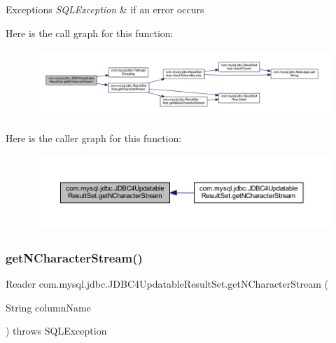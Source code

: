 \begin{DoxyExceptions}{Exceptions}
{\em S\+Q\+L\+Exception} & if an error occurs \\
\hline
\end{DoxyExceptions}
Here is the call graph for this function\+:
\nopagebreak
\begin{figure}[H]
\begin{center}
\leavevmode
\includegraphics[width=350pt]{classcom_1_1mysql_1_1jdbc_1_1_j_d_b_c4_updatable_result_set_a9abc20c9e184a65a0895a24ff6ce7c3c_cgraph}
\end{center}
\end{figure}
Here is the caller graph for this function\+:
\nopagebreak
\begin{figure}[H]
\begin{center}
\leavevmode
\includegraphics[width=350pt]{classcom_1_1mysql_1_1jdbc_1_1_j_d_b_c4_updatable_result_set_a9abc20c9e184a65a0895a24ff6ce7c3c_icgraph}
\end{center}
\end{figure}
\mbox{\label{classcom_1_1mysql_1_1jdbc_1_1_j_d_b_c4_updatable_result_set_ad28040d91ad0d2f2103e89935b84416f}} 
\subsubsection{\texorpdfstring{get\+N\+Character\+Stream()}{getNCharacterStream()}\hspace{0.1cm}{\footnotesize\ttfamily [2/2]}}
{\footnotesize\ttfamily Reader com.\+mysql.\+jdbc.\+J\+D\+B\+C4\+Updatable\+Result\+Set.\+get\+N\+Character\+Stream (\begin{DoxyParamCaption}\item[{String}]{column\+Name }\end{DoxyParamCaption}) throws S\+Q\+L\+Exception}

